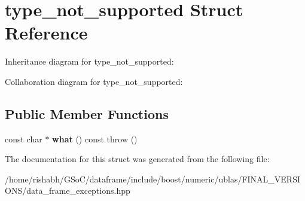 \hypertarget{structtype__not__supported}{}\section{type\+\_\+not\+\_\+supported Struct Reference}
\label{structtype__not__supported}


Inheritance diagram for type\+\_\+not\+\_\+supported\+:


Collaboration diagram for type\+\_\+not\+\_\+supported\+:
\subsection*{Public Member Functions}
\begin{DoxyCompactItemize}
\item 
const char $\ast$ {\bfseries what} () const   throw ()\hypertarget{structtype__not__supported_aa4d6c53cff984f2593d83d1027cbbab4}{}\label{structtype__not__supported_aa4d6c53cff984f2593d83d1027cbbab4}

\end{DoxyCompactItemize}


The documentation for this struct was generated from the following file\+:\begin{DoxyCompactItemize}
\item 
/home/rishabh/\+G\+So\+C/dataframe/include/boost/numeric/ublas/\+F\+I\+N\+A\+L\+\_\+\+V\+E\+R\+S\+I\+O\+N\+S/data\+\_\+frame\+\_\+exceptions.\+hpp\end{DoxyCompactItemize}
